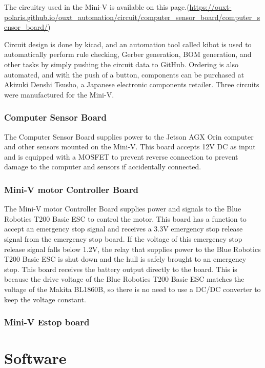 \documentclass[lettersize,journal]{IEEEtran}
\begin{document}
The circuitry used in the Mini-V is available on this page.(\url{https://ouxt-polaris.github.io/ouxt_automation/circuit/computer_sensor_board/computer_sensor_board/})

Circuit design is done by kicad, and an automation tool called kibot is used to automatically perform rule checking, Gerber generation, BOM generation, and other tasks by simply pushing the circuit data to GitHub.
Ordering is also automated, and with the push of a button, components can be purchased at Akizuki Denshi Tsusho, a Japanese electronic components retailer.
Three circuits were manufactured for the Mini-V.

\subsubsection{Computer Sensor Board}

The Computer Sensor Board supplies power to the Jetson AGX Orin computer and other sensors mounted on the Mini-V.
This board accepts 12V DC as input and is equipped with a MOSFET to prevent reverse connection to prevent damage to the computer and sensors if accidentally connected.

\subsubsection{Mini-V motor Controller Board}

The Mini-V motor Controller Board supplies power and signals to the Blue Robotics T200 Basic ESC to control the motor.
This board has a function to accept an emergency stop signal and receives a 3.3V emergency stop release signal from the emergency stop board.
If the voltage of this emergency stop release signal falls below 1.2V, the relay that supplies power to the Blue Robotics T200 Basic ESC is shut down and the hull is safely brought to an emergency stop.
This board receives the battery output directly to the board.
This is because the drive voltage of the Blue Robotics T200 Basic ESC matches the voltage of the Makita BL1860B, so there is no need to use a DC/DC converter to keep the voltage constant.

\subsubsection{Mini-V Estop board}

\section{Software}
\end{document}
